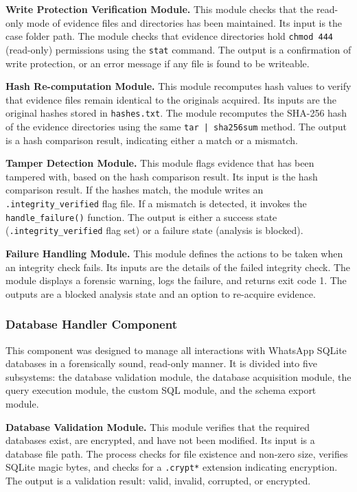 \documentclass[12pt,a4paper]{report}
\begin{document}
\textbf{Write Protection Verification Module.} This module checks that the read-only mode of evidence files and directories has been maintained. Its input is the case folder path. The module checks that evidence directories hold \texttt{chmod 444} (read-only) permissions using the \texttt{stat} command. The output is a confirmation of write protection, or an error message if any file is found to be writeable.

\textbf{Hash Re-computation Module.} This module recomputes hash values to verify that evidence files remain identical to the originals acquired. Its inputs are the original hashes stored in \texttt{hashes.txt}. The module recomputes the SHA-256 hash of the evidence directories using the same \texttt{tar | sha256sum} method. The output is a hash comparison result, indicating either a match or a mismatch.

\textbf{Tamper Detection Module.} This module flags evidence that has been tampered with, based on the hash comparison result. Its input is the hash comparison result. If the hashes match, the module writes an \texttt{.integrity\_verified} flag file. If a mismatch is detected, it invokes the \texttt{handle\_failure()} function. The output is either a success state (\texttt{.integrity\_verified} flag set) or a failure state (analysis is blocked).

\textbf{Failure Handling Module.} This module defines the actions to be taken when an integrity check fails. Its inputs are the details of the failed integrity check. The module displays a forensic warning, logs the failure, and returns exit code 1. The outputs are a blocked analysis state and an option to re-acquire evidence.

\subsubsection{Database Handler Component}

This component was designed to manage all interactions with WhatsApp SQLite databases in a forensically sound, read-only manner. It is divided into five subsystems: the database validation module, the database acquisition module, the query execution module, the custom SQL module, and the schema export module.

\textbf{Database Validation Module.} This module verifies that the required databases exist, are encrypted, and have not been modified. Its input is a database file path. The process checks for file existence and non-zero size, verifies SQLite magic bytes, and checks for a \texttt{.crypt*} extension indicating encryption. The output is a validation result: valid, invalid, corrupted, or encrypted.
\end{document}
